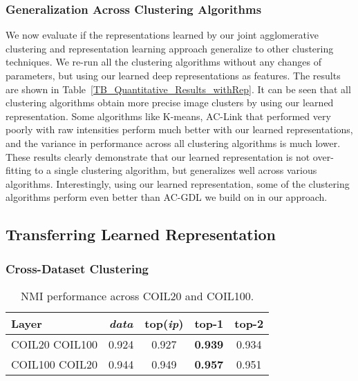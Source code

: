 \documentclass[10pt,twocolumn,letterpaper]{article}
\begin{document}
\subsubsection{Generalization Across Clustering Algorithms}

{We now evaluate if the representations learned by our joint agglomerative clustering and representation learning approach generalize to other clustering techniques.} We re-run all the clustering algorithms without any changes of parameters, but using our learned deep representations as features. The results are shown in Table~\ref{TB_Quantitative_Results_withRep}. It can be seen that {all clustering algorithms obtain more precise image clusters by using our learned representation}. {Some algorithms like K-means, AC-Link that performed very poorly with raw intensities perform much better with our learned representations}, and the variance in performance across all clustering algorithms is much lower. These results clearly demonstrate that our learned representation is not over-fitting to a single clustering algorithm, but generalizes well across various algorithms. Interestingly, using our learned representation, some of the clustering algorithms perform even better than AC-GDL we build on in our approach.

\subsection{Transferring Learned Representation}
\subsubsection{Cross-Dataset Clustering}
\begin{table}[!ht]
\caption{{NMI performance across COIL20 and COIL100.}}
\vspace{-15pt}
\center
\small
\begin{tabular}{lcccc}
  \toprule
  Layer  & \textit{data} & {top(\textit{ip})} & {top-1} & {top-2}  \\   
  \midrule
  COIL20  COIL100  & 0.924 & 0.927 & \textbf{0.939} & 0.934 \\
  COIL100  COIL20  & 0.944 & 0.949 & \textbf{0.957} & 0.951 \\  
  \bottomrule
\end{tabular}
\label{TB_Cross_Data_Group1}
\end{table}
\end{document}
